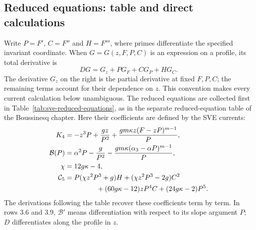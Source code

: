 \documentclass[11pt]{article}
\theoremstyle{definition}
\begin{document}
\subsection{Reduced equations: table and direct calculations}
Write $P=F'$, $C=F''$ and $H=F'''$, where primes differentiate the
specified invariant coordinate. When $G=G(z,F,P,C)$ is an expression
on a profile, its total derivative is
\begin{equation}
 D G=G_z+PG_F+CG_P+HG_C.
 \label{eq:sve-profile-total}
\end{equation}
The derivative $G_z$ on the right is the partial derivative at fixed
$F,P,C$; the remaining terms account for their dependence on $z$.
This convention makes every current calculation below unambiguous.
The reduced equations are collected first in
Table~\ref{tab:sve-reduced-equations}, as in the separate reduced-equation
table of the Boussinesq chapter. Here their coefficients are defined by
the SVE currents:
\begin{align*}
 K_4&=-z^3P+\frac{gz}{P^2}
           +\frac{gm\kappa z(F-zP)^{m-1}}P,\\
 \mathcal B(P)&=\alpha^2P-\frac g{P^2}
           -\frac{gm\kappa(\alpha_3-\alpha P)^{m-1}}P,\\
 \chi&=12g\kappa-4,\\
 \mathcal C_5&=P(\chi z^2P^3+g)H+(\chi z^2P^3-2g)C^2\\
 &\hspace{1.6cm}+(60g\kappa-12)zP^4C+(24g\kappa-2)P^5.
\end{align*}
The derivations following the table recover these coefficients term by term.
In rows 3.6 and 3.9, $\mathcal B'$ means differentiation with respect to
its slope argument $P$; $D$ differentiates along the profile in $z$.
\end{document}
